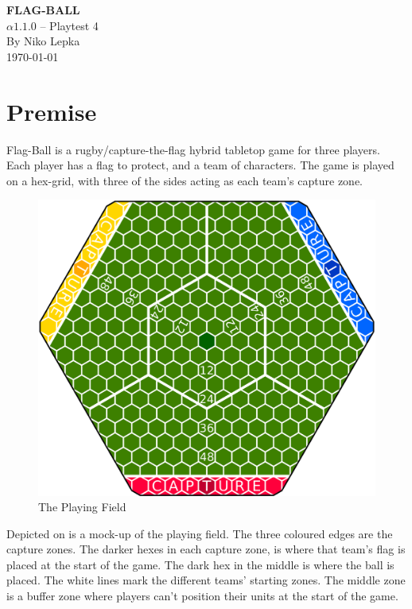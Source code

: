 \documentclass[a4paper]{book}
\begin{document}
\begin{titlepage}
\begin{center}
    \huge{\textbf{FLAG-BALL}}\\
    \LARGE{
        $\alpha1.1.0$ -- Playtest 4\\
        By Niko Lepka
    }\\
    \Large{\today}
\end{center}
\end{titlepage}
\thispagestyle{empty} %
\frontmatter %

\section*{Premise}
Flag-Ball is a rugby/capture-the-flag hybrid tabletop game for three players.
Each player has a flag to protect, and a team of characters.
The game is played on a hex-grid, with three of the sides acting as each team's capture zone.
\begin{figure}
    \centering
    \includegraphics[width=\textwidth]{graphics/board-2}
    \caption{The Playing Field}
    \label{fig:court}
\end{figure}
Depicted on  is a mock-up of the playing field.
The three coloured edges are the capture zones.
The darker hexes in each capture zone, is where that team's flag is placed at the start of the game.
The dark hex in the middle is where the ball is placed.
The white lines mark the different teams' starting zones.
The middle zone is a buffer zone where players can’t position their units at the start of the game.
\end{document}
